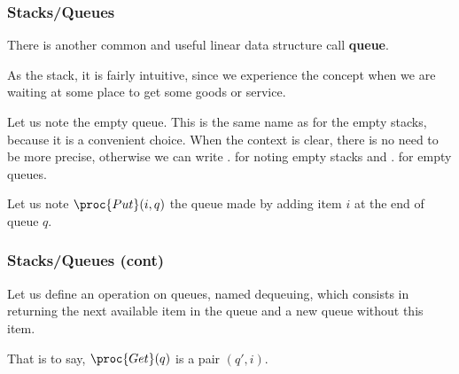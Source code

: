 
%
\begin{frame}
\frametitle{Stacks/Queues}

There is another common and useful linear data structure call
\textbf{queue}. 

\bigskip

As the stack, it is fairly intuitive, since we experience the concept
when we are waiting at some place to get some goods or service.

\bigskip

Let us note  the empty queue. This is the same name as for
the empty stacks, because it is a convenient choice. When the context
is clear, there is no need to be more precise, otherwise we can write
. for noting empty stacks and
. for empty queues.

\bigskip

Let us note \(\proc{Put} (i, q)\) the queue made by adding item
\(i\) at the end of queue \(q\).

\end{frame}

%
\begin{frame}
\frametitle{Stacks/Queues (cont)}

Let us define an operation on queues, named dequeuing, which consists
in returning the next available item in the queue and a new queue
without this item.

\bigskip

That is to say, \(\proc{Get} (q)\) is a pair \((q', i)\).

\end{frame}



